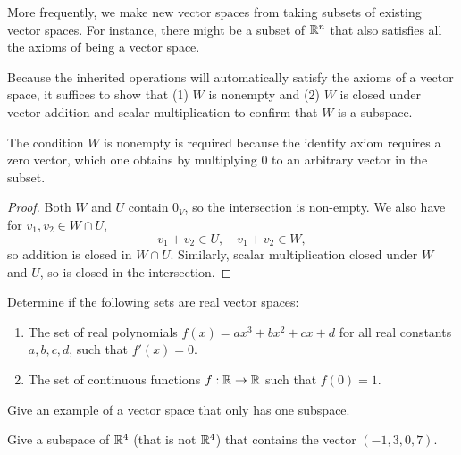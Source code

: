 More frequently, we make new vector spaces from taking subsets of existing vector spaces. For instance, there might be a subset of $\mathbb{R}^n$ that also satisfies all the axioms of being a vector space.

\begin{remark}
	Because the inherited operations will automatically satisfy the axioms of a vector space, it suffices to show that (1) $W$ is nonempty and (2) $W$ is closed under vector addition and scalar multiplication to confirm that $W$ is a subspace.
\end{remark}
The condition $W$ is nonempty is required because the identity axiom requires a zero vector, which one obtains by multiplying $0$ to an arbitrary vector in the subset.
\begin{proof}
	Both $W$ and $U$ contain $0_V$, so the intersection is non-empty. We also have for $v_1,v_2\in W\cap U$,\[
		v_1 + v_2 \in U, \quad v_1+v_2\in W,
	\] so addition is closed in $W\cap U$. Similarly, scalar multiplication closed under $W$ and $U$, so is closed in the intersection.
\end{proof}
\exercises
\begin{exerciselist}
	\item Determine if the following sets are real vector spaces:\begin{enumerate}[label=(\alph*)]
		\item The set of real polynomials $f(x)=ax^3+bx^2+cx+d$ for all real constants $a,b,c,d$, such that $f\prime (x)=0$.
		\item The set of continuous functions $f:\mathbb{R}\to\mathbb{R}$ such that $f(0)=1$.
	\end{enumerate}
	\item Give an example of a vector space that only has one subspace.
	\item Give a subspace of $\mathbb{R}^4$ (that is not $\mathbb{R}^4$) that contains the vector $(-1,3,0,7)$.
\end{exerciselist}

